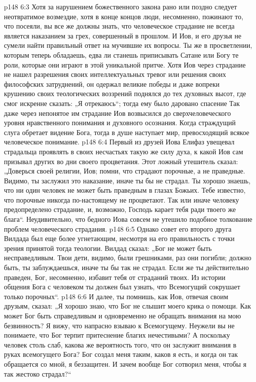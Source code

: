 \vs p148 6:3 Хотя за нарушением божественного закона рано или поздно следует неотвратимое возмездие, хотя в конце концов люди, несомненно, пожинают то, что посеяли, вы все же должны знать, что человеческое страдание не всегда является наказанием за грех, совершенный в прошлом. И Иов, и его друзья не сумели найти правильный ответ на мучившие их вопросы. Ты же в просветлении, которым теперь обладаешь, едва ли станешь приписывать Сатане или Богу те роли, которые они играют в этой уникальной притче. Хотя Иов через страдание не нашел разрешения своих интеллектуальных тревог или решения своих философских затруднений, он одержал великие победы и даже вопреки крушению своих теологических воззрений поднялся до тех духовных высот, где смог искренне сказать: „Я отрекаюсь“; тогда ему было даровано спасение  Так даже через непонятое им страдание Иов возвысился до сверхчеловеческого уровня нравственного понимания и духовного осознания. Когда страждущий слуга обретает видение Бога, тогда в душе наступает мир, превосходящий всякое человеческое понимание.
\vs p148 6:4 Первый из друзей Иова Елифаз увещевал страдальца проявлять в своих несчастьях такую же силу духа, к какой Иов сам призывал других во дни своего процветания. Этот ложный утешитель сказал: „Доверься своей религии, Иов; помни, что страдают порочные, а не праведные. Видимо, ты заслужил это наказание, иначе ты бы не страдал. Ты хорошо знаешь, что ни один человек не может быть праведным в глазах Божьих. Тебе известно, что порочные никогда по\hyp{}настоящему не процветают. Так или иначе человеку предопределено страдание, и, возможно, Господь карает тебя ради твоего же блага“. Неудивительно, что бедного Иова совсем не утешило подобное толкование проблем человеческого страдания.
\vs p148 6:5 Однако совет его второго друга Вилдада был еще более угнетающим, несмотря на его правильность с точки зрения принятой тогда теологии. Вилдад сказал: „Бог не может быть несправедливым. Твои дети, видимо, были грешниками, раз они погибли; должно быть, ты заблуждаешься, иначе ты бы так не страдал. Если же ты действительно праведен, Бог, несомненно, избавит тебя от страданий твоих. Из истории общения Бога с человеком ты должен был узнать, что Всемогущий сокрушает только порочных“.
\vs p148 6:6 И далее, ты помнишь, как Иов, отвечая своим друзьям, сказал: „Я хорошо знаю, что Бог не слышит моего крика о помощи. Как может Бог быть справедливым и одновременно не обращать внимания на мою безвинность? Я вижу, что напрасно взываю к Всемогущему. Неужели вы не понимаете, что Бог терпит притеснение благих нечестивыми? А поскольку человек столь слаб, какова же вероятность того, что он заслужит внимания в руках всемогущего Бога? Бог создал меня таким, каков я есть, и когда он так обращается со мной, я беззащитен. И зачем вообще Бог сотворил меня, чтобы я так жестоко страдал?“
